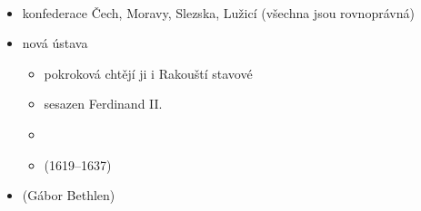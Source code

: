 \paragraph{}
\begin{itemize}
\item konfederace Čech, Moravy, Slezska, Lužicí (všechna jsou rovnoprávná)
\item nová ústava 
\begin{itemize}
	\item pokroková \ra chtějí ji i Rakouští stavové
	\item sesazen Ferdinand II.
	\item[\ra] 
	\item {} (1619--1637)
\end{itemize}
\item {}(Gábor Bethlen)
\end{itemize}

